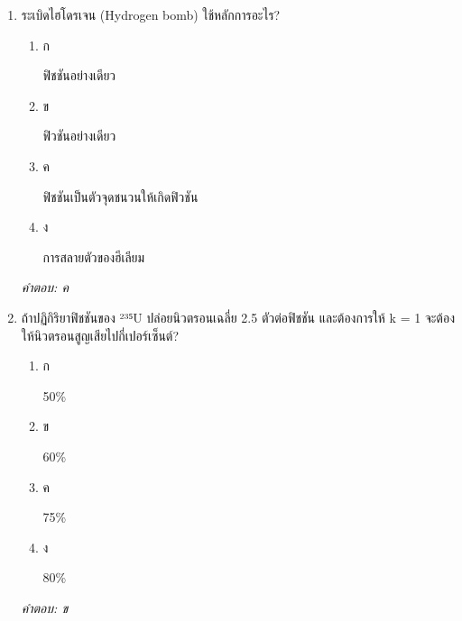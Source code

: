\documentclass[12pt]{article}
\begin{document}
\begin{enumerate}[label=\arabic*., itemsep=0.5\baselineskip, topsep=0.5\baselineskip, leftmargin=*]
\item ระเบิดไฮโดรเจน (Hydrogen bomb) ใช้หลักการอะไร?
\begin{enumerate}[label=\alph*)., itemsep=0.3\baselineskip, topsep=0.3\baselineskip]
\item ก\ 
\begin{minipage}[t]{0.9\linewidth}
\raggedright ฟิชชันอย่างเดียว
\end{minipage}
\item ข\ 
\begin{minipage}[t]{0.9\linewidth}
\raggedright ฟิวชันอย่างเดียว
\end{minipage}
\item ค\ 
\begin{minipage}[t]{0.9\linewidth}
\raggedright ฟิชชันเป็นตัวจุดชนวนให้เกิดฟิวชัน
\end{minipage}
\item ง\ 
\begin{minipage}[t]{0.9\linewidth}
\raggedright การสลายตัวของฮีเลียม
\end{minipage}
\end{enumerate}
\vspace{-0.3\baselineskip}
\begin{small}
\textit{คำตอบ: ค}
\end{small}

\item ถ้าปฏิกิริยาฟิชชันของ ²³⁵U ปล่อยนิวตรอนเฉลี่ย 2.5 ตัวต่อฟิชชัน และต้องการให้ k = 1 จะต้องให้นิวตรอนสูญเสียไปกี่เปอร์เซ็นต์?
\begin{enumerate}[label=\alph*)., itemsep=0.3\baselineskip, topsep=0.3\baselineskip]
\item ก\ 
\begin{minipage}[t]{0.9\linewidth}
\raggedright 50\%
\end{minipage}
\item ข\ 
\begin{minipage}[t]{0.9\linewidth}
\raggedright 60\%
\end{minipage}
\item ค\ 
\begin{minipage}[t]{0.9\linewidth}
\raggedright 75\%
\end{minipage}
\item ง\ 
\begin{minipage}[t]{0.9\linewidth}
\raggedright 80\%
\end{minipage}
\end{enumerate}
\vspace{-0.3\baselineskip}
\begin{small}
\textit{คำตอบ: ข}
\end{small}


\end{enumerate}
\end{document}
